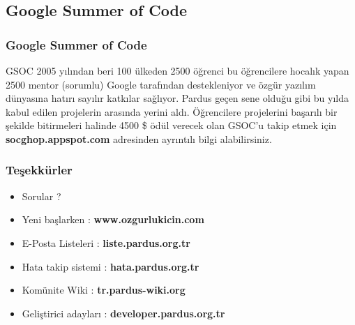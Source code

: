 \documentclass{beamer}
\begin{document}
\subsection{Google Summer of Code}
\frame
{
    \frametitle{Google Summer of Code}
    \begin{block}{GSOC}
        2005 yılından beri 100 ülkeden 2500 öğrenci bu öğrencilere hocalık yapan 2500 mentor (sorumlu) Google tarafından destekleniyor ve özgür yazılım dünyasına hatırı sayılır katkılar sağlıyor. Pardus geçen sene olduğu gibi bu yılda kabul edilen projelerin arasında yerini aldı. Öğrencilere projelerini başarılı bir şekilde bitirmeleri halinde 4500 \$ ödül verecek olan GSOC'u takip etmek için \textbf{socghop.appspot.com} adresinden ayrıntılı bilgi alabilirsiniz.
    \end{block}
}


\frame
{
	\frametitle{Teşekkürler}
	\begin{itemize}
        \item Sorular ?
	\end{itemize}

	\begin{itemize}
        \item Yeni başlarken : \textbf{www.ozgurlukicin.com}
        \item E-Posta Listeleri : \textbf{liste.pardus.org.tr}
        \item Hata takip sistemi : \textbf{hata.pardus.org.tr}
        \item Komünite Wiki : \textbf{tr.pardus-wiki.org}
        \item Geliştirici adayları : \textbf{developer.pardus.org.tr}
	\end{itemize}

}
\end{document}
